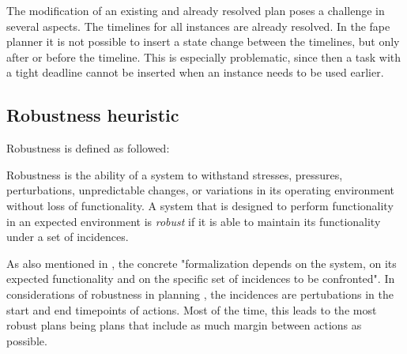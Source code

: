 The modification of an existing and already resolved plan poses a challenge in several aspects.
The timelines for all instances are already resolved.
In the fape planner it is not possible to insert a state change between the timelines, but only after or before the timeline.
This is especially problematic, since then a task with a tight deadline cannot be inserted when an instance needs to be used earlier.



\subsection{Robustness heuristic}

Robustness is defined as followed:

\begin{definition}
    Robustness is the ability of a system to withstand stresses, pressures, perturbations, unpredictable changes, or variations in its operating environment without loss of functionality.
    A system that is designed to perform functionality in an expected environment is \emph{robust} if it is able to maintain its functionality under a set of incidences. \citep{barberRobustnessStabilityRecoverability2015}
\end{definition}

As also mentioned in \cite{barberRobustnessStabilityRecoverability2015}, the concrete "formalization depends on the system, on its expected functionality and on the specific set of incidences to be confronted".
In considerations of robustness in planning \citep{lundRobustExecutionProbabilistic2017}, the incidences are pertubations in the start and end timepoints of actions.
Most of the time, this leads to the most robust plans being plans that include as much margin between actions as possible.

